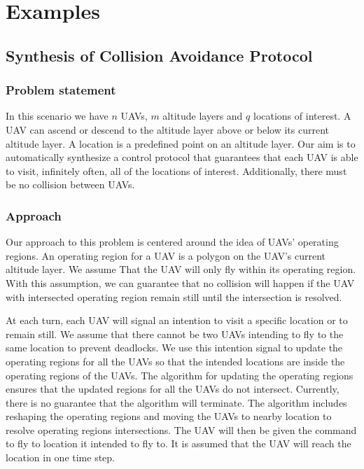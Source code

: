 \documentclass[]{article}
\author{}
\date{}
\begin{document}
\section{Examples}\label{examples}

\subsection{Synthesis of Collision Avoidance
Protocol}\label{synthesis-collision-avoidance-protocol}

\subsubsection{Problem statement}\label{problem-statement}

In this scenario we have $n$ UAVs, $m$ altitude layers and $q$ locations of
interest. A UAV can ascend or descend to the altitude layer above or
below its current altitude layer. A location is a predefined
point on an altitude layer. Our aim is to automatically synthesize a
control protocol that guarantees that each UAV is able to visit, infinitely
often, all of the locations of interest. Additionally, there must be no collision 
between UAVs.

\subsubsection{Approach}\label{approach}
Our approach to this problem is centered around the idea of UAVs'
operating regions. An operating region for a UAV is a polygon on the
UAV's current altitude layer. We assume That the UAV will only fly
within its operating region. With this assumption, we can guarantee that
no collision will happen if the UAV with intersected operating region
remain still until the intersection is resolved.

At each turn, each UAV will signal an intention to visit a specific location 
or to remain still. We assume that there cannot be two UAVs intending to fly 
to the same location to prevent deadlocks. We use this intention signal to update 
the operating regions for all the UAVs so that the intended locations are inside 
the operating regions of the UAVs. The algorithm for updating the operating regions 
ensures that the updated regions for all the UAVs do not intersect. Currently, there 
is no guarantee that the algorithm will terminate. The algorithm includes reshaping 
the operating regions and moving the UAVs to nearby location to resolve operating 
regions intersections. The UAV will then be given the command to fly to location it 
intended to fly to. It is assumed that the UAV will reach the location in one time step. 
\end{document}
